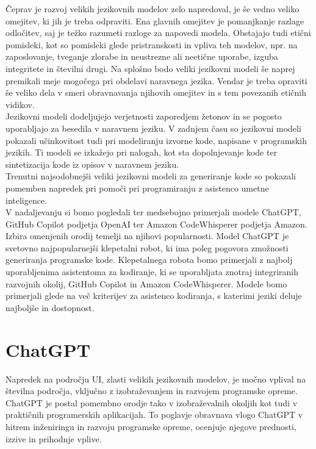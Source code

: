\documentclass[a4paper,12pt,openright]{book}
\begin{document}
Čeprav je razvoj velikih jezikovnih modelov zelo napredoval, je še vedno veliko omejitev, ki jih je treba odpraviti. Ena glavnih omejitev je pomanjkanje razlage odločitev, saj je težko razumeti razloge za napovedi modela. Obstajajo tudi etični pomisleki, kot so pomisleki glede pristranskosti in vpliva teh modelov, npr. na zaposlovanje, tveganje zlorabe in neustrezne ali neetične uporabe, izguba integritete in številni drugi. Na splošno bodo veliki jezikovni modeli še naprej premikali meje mogočega pri obdelavi naravnega jezika. Vendar je treba opraviti še veliko dela v smeri obravnavanja njihovih omejitev in s tem povezanih etičnih vidikov. \\
Jezikovni modeli dodeljujejo verjetnosti zaporedjem žetonov in se pogosto uporabljajo za besedila v naravnem jeziku. V zadnjem času so jezikovni modeli pokazali učinkovitost tudi pri modeliranju izvorne kode, napisane v programskih jezikih. Ti modeli se izkažejo pri nalogah, kot sta dopolnjevanje kode ter sintetizacija kode iz opisov v naravnem jeziku. \\
Trenutni najsodobnejši veliki jezikovni modeli za generiranje kode so pokazali pomemben napredek pri pomoči pri programiranju z asistenco umetne inteligence.  \cite{KASNECI2023102274, vaswani2023attention} \\
V nadaljevanju si bomo pogledali ter medsebojno primerjali modele ChatGPT, GitHub Copilot podjetja OpenAI ter Amazon CodeWhisperer podjetja Amazon. Izbira omenjenih orodij temelji na njihovi popularnosti. Model ChatGPT je svetovno najpopularnejši klepetalni robot, ki ima poleg pogovora zmožnosti generiranja programske kode\cite{wu2023brief}. Klepetalnega robota bomo primerjali z najbolj uporabljenima asistentoma za kodiranje, ki se uporabljata znotraj integriranih razvojnih okolij, GitHub Copilot in Amazon CodeWhisperer. Modele bomo primerjali glede na več kriterijev za asistenco kodiranja, s katerimi jeziki deluje najboljše in dostopnost.

\section{ChatGPT}
Napredek na področju UI, zlasti velikih jezikovnih modelov, je močno vplival na številna področja, vključno z izobraževanjem in razvojem programske opreme. ChatGPT je postal pomembno orodje tako v izobraževalnih okoljih kot tudi v praktičnih programerskih aplikacijah. To poglavje obravnava vlogo ChatGPT v hitrem inženiringu in razvoju programske opreme, ocenjuje njegove prednosti, izzive in prihodnje vplive.
\end{document}
